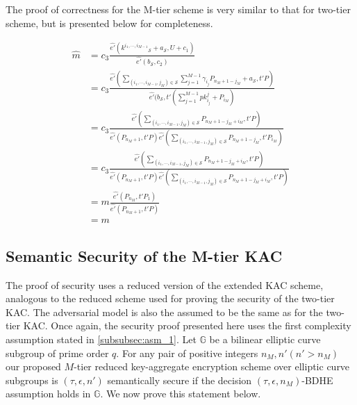 The proof of correctness for the M-tier scheme is very similar to that for two-tier scheme, but is presented below for completeness. 

\begin{scriptsize}
\begin{equation}
\begin{split}
 \hat{m} &= c_3\frac{\hat{e'}({k^{i_1,\cdots,i_{M-1}}}_{\mathcal{S}}+a_{\mathcal{S}},U+c_1)}{\hat{e'}(b_{\mathcal{S}},c_2)}\\
  &= c_3\frac{\hat{e'}(\sum_{(i_1,\cdots,i_{M-1},j_M)\in \mathcal{S}}\sum_{j=1}^{M-1}{\gamma_{i_j}}P_{n_M+1-j_M} + a_{\mathcal{S}},t'P)}{\hat{e'}(b_\mathcal{S},t'(\sum_{j=1}^{M-1}pk^{j}_{i_j}+P_{i_M})}\\
  &= c_3\frac{\hat{e'}(\sum_{(i_1,\cdots,i_{M-1},j_M)\in\mathcal{S}}P_{n_M+1-j_M+i_M},t'P)}{\hat{e'}(P_{n_M+1},t'P)\hat{e'}(\sum_{(i_1,\cdots,i_{M-1},j_M)\in\mathcal{S}}P_{n_M+1-j_M},t'P_{i_M})}\\
  &= c_3\frac{\hat{e'}(\sum_{(i_1,\cdots,i_{M-1},j_M)\in\mathcal{S}}P_{n_M+1-j_M+i_M},t'P)}{\hat{e'}(P_{n_M+1},t'P)\hat{e'}(\sum_{(i_1,\cdots,i_{M-1},j_M)\in\mathcal{S}}P_{n_M+1-j_M+i_M},t'P)}\\
  &= m\frac{\hat{e'}(P_{n_M},t'P_1)}{\hat{e'}(P_{n_M+1},t'P)}\\
  &= m
\end{split} 
\end{equation}
\end{scriptsize}

\subsection{Semantic Security of the M-tier KAC}
\label{subsec:proof_MTier}

The proof of security uses a reduced version of the extended KAC scheme, analogous to the reduced scheme used for proving the security of the two-tier KAC. The adversarial model is also the assumed to be the same as for the two-tier KAC. Once again, the security proof presented here uses the first complexity assumption stated in \ref{subsubsec:asm_1}. Let $\mathbb{G}$ be a bilinear elliptic curve subgroup of prime order $q$. For any pair of positive integers $n_M,n' (n'>n_M)$ our proposed $M$-tier reduced key-aggregate encryption scheme over elliptic curve subgroups is $(\tau,\epsilon,n')$ semantically secure if the decision $(\tau,\epsilon,n_M)$-BDHE assumption holds in $\mathbb{G}$. We now prove this statement below.

